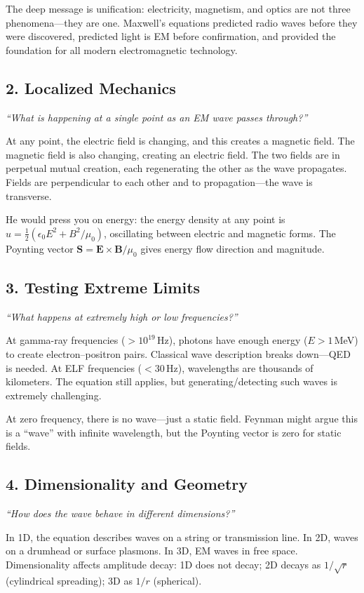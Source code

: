 The deep message is unification: electricity, magnetism, and optics are not three phenomena---they are one. Maxwell's equations predicted radio waves before they were discovered, predicted light is EM before confirmation, and provided the foundation for all modern electromagnetic technology.

\subsection*{2. Localized Mechanics}
\textit{``What is happening at a single point as an EM wave passes through?''}

At any point, the electric field is changing, and this creates a magnetic field. The magnetic field is also changing, creating an electric field. The two fields are in perpetual mutual creation, each regenerating the other as the wave propagates. Fields are perpendicular to each other and to propagation---the wave is transverse.

He would press you on energy: the energy density at any point is $u = \frac{1}{2}(\epsilon_0 E^2 + B^2/\mu_0)$, oscillating between electric and magnetic forms. The Poynting vector $\mathbf{S} = \mathbf{E} \times \mathbf{B}/\mu_0$ gives energy flow direction and magnitude.

\subsection*{3. Testing Extreme Limits}
\textit{``What happens at extremely high or low frequencies?''}

At gamma-ray frequencies ($> 10^{19}$\,Hz), photons have enough energy ($E > 1$\,MeV) to create electron--positron pairs. Classical wave description breaks down---QED is needed. At ELF frequencies ($< 30$\,Hz), wavelengths are thousands of kilometers. The equation still applies, but generating/detecting such waves is extremely challenging.

At zero frequency, there is no wave---just a static field. Feynman might argue this is a ``wave'' with infinite wavelength, but the Poynting vector is zero for static fields.

\subsection*{4. Dimensionality and Geometry}
\textit{``How does the wave behave in different dimensions?''}

In 1D, the equation describes waves on a string or transmission line. In 2D, waves on a drumhead or surface plasmons. In 3D, EM waves in free space. Dimensionality affects amplitude decay: 1D does not decay; 2D decays as $1/\sqrt{r}$ (cylindrical spreading); 3D as $1/r$ (spherical).

